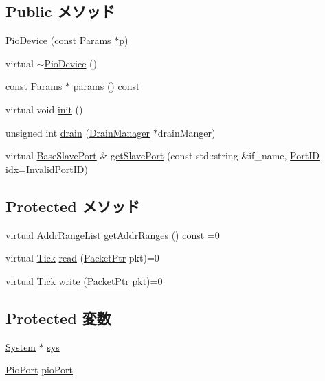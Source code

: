 \subsection*{Public メソッド}
\begin{DoxyCompactItemize}
\item 
\hyperlink{classPioDevice_a0070809b25a5a5f3b3195a0fe94a2121}{PioDevice} (const \hyperlink{classPioDevice_a9cdbda5b5cc24147ce82b7d07bf03cd1}{Params} $\ast$p)
\item 
virtual \hyperlink{classPioDevice_a70ec6cbb62f7ecf57b0c662c7618c7e6}{$\sim$PioDevice} ()
\item 
const \hyperlink{classPioDevice_a9cdbda5b5cc24147ce82b7d07bf03cd1}{Params} $\ast$ \hyperlink{classPioDevice_acd3c3feb78ae7a8f88fe0f110a718dff}{params} () const 
\item 
virtual void \hyperlink{classPioDevice_a02fd73d861ef2e4aabb38c0c9ff82947}{init} ()
\item 
unsigned int \hyperlink{classPioDevice_a6bf479c521c7c3eb473822d953275b26}{drain} (\hyperlink{classDrainManager}{DrainManager} $\ast$drainManger)
\item 
virtual \hyperlink{classBaseSlavePort}{BaseSlavePort} \& \hyperlink{classPioDevice_ac918a145092d7514ebc6dbd952dceafb}{getSlavePort} (const std::string \&if\_\-name, \hyperlink{base_2types_8hh_acef4d7d41cb21fdc252e20c04cd7bb8e}{PortID} idx=\hyperlink{base_2types_8hh_a65bf40f138cf863f0c5e2d8ca1144126}{InvalidPortID})
\end{DoxyCompactItemize}
\subsection*{Protected メソッド}
\begin{DoxyCompactItemize}
\item 
virtual \hyperlink{classstd_1_1list}{AddrRangeList} \hyperlink{classPioDevice_a6e967f8921e80748eb2be35b6b481a7e}{getAddrRanges} () const =0
\item 
virtual \hyperlink{base_2types_8hh_a5c8ed81b7d238c9083e1037ba6d61643}{Tick} \hyperlink{classPioDevice_a842312590432036092c422c87a442358}{read} (\hyperlink{classPacket}{PacketPtr} pkt)=0
\item 
virtual \hyperlink{base_2types_8hh_a5c8ed81b7d238c9083e1037ba6d61643}{Tick} \hyperlink{classPioDevice_afe8371668d023bb2516b286e5e399b6f}{write} (\hyperlink{classPacket}{PacketPtr} pkt)=0
\end{DoxyCompactItemize}
\subsection*{Protected 変数}
\begin{DoxyCompactItemize}
\item 
\hyperlink{classSystem}{System} $\ast$ \hyperlink{classPioDevice_a8ae37465ba84acfef6af3e9b9e6dbbd5}{sys}
\item 
\hyperlink{classPioPort}{PioPort} \hyperlink{classPioDevice_a13e5e3439c77b7b772e2e11df33fd700}{pioPort}
\end{DoxyCompactItemize}

